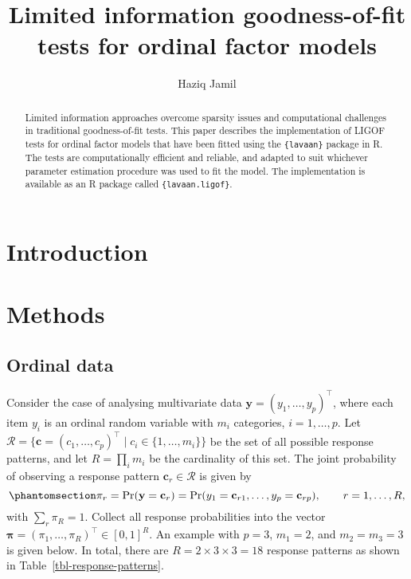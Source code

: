 \documentclass[
  letterpaper,
  DIV=11,
  numbers=noendperiod]{scrartcl}
\title{Limited information goodness-of-fit tests for ordinal factor
models}
\author{Haziq Jamil}
\date{}
\begin{document}
\maketitle
\begin{abstract}
Limited information approaches overcome sparsity issues and
computational challenges in traditional goodness-of-fit tests. This
paper describes the implementation of LIGOF tests for ordinal factor
models that have been fitted using the \texttt{\{lavaan\}} package in R.
The tests are computationally efficient and reliable, and adapted to
suit whichever parameter estimation procedure was used to fit the model.
The implementation is available as an R package called
\texttt{\{lavaan.ligof\}}.
\end{abstract}


\section{Introduction}\label{introduction}

\section{Methods}\label{methods}

\subsection{Ordinal data}\label{ordinal-data}

Consider the case of analysing multivariate data
\(\mathbf y = (y_{1}, \ldots, y_{p})^\top\), where each item \(y_{i}\)
is an ordinal random variable with \(m_i\) categories, \(i=1,\dots,p\).
Let
\(\mathcal R = \{ \mathbf c = (c_1,\dots, c_p)^\top \mid c_i \in \{1,\dots, m_i\}\}\)
be the set of all possible response patterns, and let
\(R=\prod_{i} m_i\) be the cardinality of this set. The joint
probability of observing a response pattern
\(\mathbf c_r \in \mathcal R\) is given by
\begin{equation}\phantomsection\label{eq-each-joint-resp-prob}{
\pi_r = \Pr(\mathbf y = \mathbf c_r) = \Pr(y_1 = \mathbf c_{r1}, \ldots, y_p = \mathbf c_{rp}), \hspace{2em} r = 1, \ldots, R,
}\end{equation} with \(\sum_r \pi_R = 1\). Collect all response
probabilities into the vector
\(\boldsymbol \pi = (\pi_1, \ldots, \pi_R)^\top \in [0,1]^R\). An
example with \(p=3\), \(m_1=2\), and \(m_2=m_3=3\) is given below. In
total, there are \(R=2 \times 3 \times 3 = 18\) response patterns as
shown in Table~\ref{tbl-response-patterns}.
\end{document}
